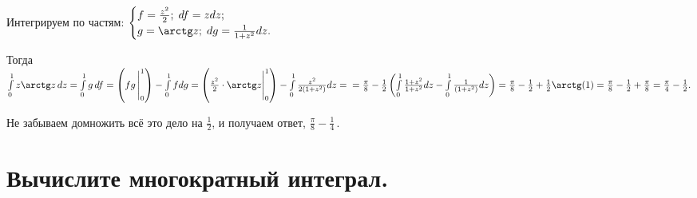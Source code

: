 \documentclass[a4paper, fleqn]{article}
\begin{document}
     Интегрируем по частям: $\begin{cases} f = \frac{z^2}{2}; \; df = zdz; \\
     g  = \arctg z; \; dg = \frac{1}{1 + z^2} dz.
     \end{cases}$

     Тогда $\int\limits_{0}^{1} z \arctg z \, dz = \int\limits_{0}^{1} g \, df = \left( fg \,  \Bigg|_{0}^{1} \right) - \int\limits_{0}^{1} fdg =  \left( \frac{z^2}{2} \cdot \arctg z \Bigg|_{0}^{1} \right) - \int\limits_{0}^{1} \frac{z^2}{2(1 + z^2)} dz = \\ = \frac{\pi}{8} -  \frac{1}{2} \left(\int\limits_{0}^{1} \frac{1 + z^2}{1 + z^2} dz -  \int\limits_{0}^{1} \frac{1}{(1 + z^2)} dz\right) = \frac{\pi}{8} - \frac{1}{2} + \frac{1}{2} \arctg(1) = \frac{\pi}{8} - \frac{1}{2} + \frac{\pi}{8} = \frac{\pi}{4} - \frac{1}{2}.$ 

     Не забываем домножить всё это дело на $\frac{1}{2}$, и получаем ответ, $\boxed{\frac{\pi}{8} - \frac{1}{4}} \, .$

    
    
    
    
    \section*{Вычислите многократный интеграл.}
    
    
    
    
    
    
\end{document}
